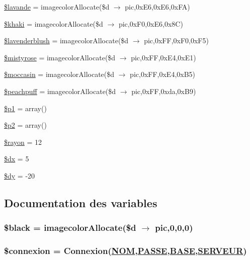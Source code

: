 \begin{CompactItemize}
\item 
\hyperlink{biotox__carto_8php_a15}{\$lavande} = imagecolor\-Allocate(\$d $\rightarrow$ pic,0x\-E6,0x\-E6,0x\-FA)
\item 
\hyperlink{biotox__carto_8php_a16}{\$khaki} = imagecolor\-Allocate(\$d $\rightarrow$ pic,0x\-F0,0x\-E6,0x8C)
\item 
\hyperlink{biotox__carto_8php_a17}{\$lavenderblush} = imagecolor\-Allocate(\$d $\rightarrow$ pic,0x\-FF,0x\-F0,0x\-F5)
\item 
\hyperlink{biotox__carto_8php_a18}{\$mistyrose} = imagecolor\-Allocate(\$d $\rightarrow$ pic,0x\-FF,0x\-E4,0x\-E1)
\item 
\hyperlink{biotox__carto_8php_a19}{\$moccasin} = imagecolor\-Allocate(\$d $\rightarrow$ pic,0x\-FF,0x\-E4,0x\-B5)
\item 
\hyperlink{biotox__carto_8php_a20}{\$peachpuff} = imagecolor\-Allocate(\$d $\rightarrow$ pic,0x\-FF,0xda,0x\-B9)
\item 
\hyperlink{biotox__carto_8php_a21}{\$p1} = array()
\item 
\hyperlink{biotox__carto_8php_a22}{\$p2} = array()
\item 
\hyperlink{biotox__carto_8php_a23}{\$rayon} = 12
\item 
\hyperlink{biotox__carto_8php_a24}{\$dx} = 5
\item 
\hyperlink{biotox__carto_8php_a25}{\$dy} = -20
\end{CompactItemize}


\subsection{Documentation des variables}
\hypertarget{biotox__carto_8php_a13}{
\subsubsection[\$black]{\setlength{\rightskip}{0pt plus 5cm}\$black = imagecolor\-Allocate(\$d $\rightarrow$ pic,0,0,0)}}
\label{biotox__carto_8php_a13}


\hypertarget{biotox__carto_8php_a3}{
\subsubsection[\$connexion]{\setlength{\rightskip}{0pt plus 5cm}\$connexion = Connexion(\hyperlink{pma__connect_8php_a0}{NOM},\hyperlink{pma__connect_8php_a1}{PASSE},\hyperlink{pma__connect_8php_a3}{BASE},\hyperlink{pma__connect_8php_a2}{SERVEUR})}}
\label{biotox__carto_8php_a3}


